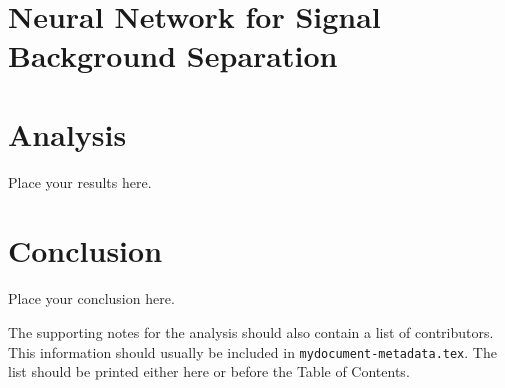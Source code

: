 \documentclass[NOTE, atlasdraft=true, texlive=2016, UKenglish]{\ATLASLATEXPATH atlasdoc}
\begin{document}
\newpage
\section{Neural Network for Signal Background Separation}
\label{sec:neuralnet}

\newpage
\section{Analysis}
\label{sec:analysis}

Place your results here.



\newpage
\section{Conclusion}
\label{sec:conclusion}

Place your conclusion here.





\clearpage
The supporting notes for the analysis should also contain a list of contributors.
This information should usually be included in \texttt{mydocument-metadata.tex}.
The list should be printed either here or before the Table of Contents.
\end{document}
